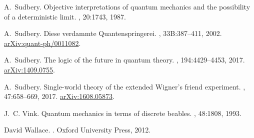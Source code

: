 \documentclass[12pt,a4paper,reqno]{article}
\renewcommand{\(}{\left(}
\renewcommand{\)}{\right)}
\renewcommand{\.}{\centerdot}
\newcommand{\1}{\mathbf{1}}
\newcommand{\<}{\langle}
\renewcommand{\>}{\rangle}
\theoremstyle{definition}
\theoremstyle{remark}
\numberwithin{equation}{section}
\begin{document}
\begin{thebibliography}{10}
A.~Sudbery.
\newblock Objective interpretations of quantum mechanics and the possibility of
  a deterministic limit.
, 20:1743, 1987.

A.~Sudbery.
\newblock Diese verdammte {Q}uantenspringerei.
, 33B:387--411, 2002.
\newblock
  \href{https://arxiv.org/abs/quant-ph/0011082}{arXiv:quant-ph/0011082}.

A.~Sudbery.
\newblock The logic of the future in quantum theory.
, 194:4429--4453, 2017.
\newblock \href{https://arxiv.org/abs/1409.0755}{arXiv:1409.0755}.

A.~Sudbery.
\newblock Single-world theory of the extended {W}igner's friend experiment.
, 47:658--669, 2017.
\newblock \href{https://arxiv.org/abs/1608.05873}{arXiv:1608.05873}.

J.~C. Vink.
\newblock Quantum mechanics in terms of discrete beables.
, 48:1808, 1993.

David Wallace.
.
\newblock Oxford University Press, 2012.

\end{thebibliography}
\end{document}
